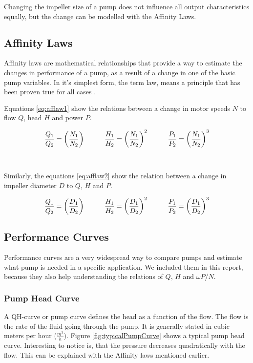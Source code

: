 Changing the impeller size of a pump does not influence all output characteristics equally,
but the change can be modelled with the Affinity Laws.

\subsection{Affinity Laws}\label{sub:afflaws}
Affinity laws are mathematical relationships that provide a way to estimate the 
changes in performance of a pump, as a result of a change in one of the basic pump variables.
In it's simplest form, the term law, means a principle that has been proven true for all cases \cite{Bachus2003}.

Equations \ref{eq:afflaw1} show the relations between a change in motor speeds $N$
to flow $Q$, head $H$ and power $P$.

\begin{equation}
	\frac{Q_1}{Q_2} = \left(\frac{N_1}{N_2}\right)
	\hspace{10mm}
	\frac{H_1}{H_2} = \left(\frac{N_1}{N_2}\right)^2
	\hspace{10mm}
	\frac{P_1}{P_2} = \left(\frac{N_1}{N_2}\right)^3
	\label{eq:afflaw1}	
\end{equation}
\cite{Volk2014}\\\\
Similarly, the equations \ref{eq:afflaw2} show the relation between a change in impeller diameter $D$
to  $Q$, $H$ and $P$.

\begin{equation}
	\frac{Q_1}{Q_2} = \left(\frac{D_1}{D_2}\right)
	\hspace{10mm}
	\frac{H_1}{H_2} = \left(\frac{D_1}{D_2}\right)^2
	\hspace{10mm}
	\frac{P_1}{P_2} = \left(\frac{D_1}{D_2}\right)^3
	\label{eq:afflaw2}	
\end{equation}
\cite{Volk2014}

\subsection{Performance Curves}
Performance curves are a very widespread way to compare pumps
and estimate what pump is needed in a specific application.
We included them in this report,
because they also help understanding the relations of $Q$, $H$ and $\omega P$/$N$.

\subsubsection{Pump Head Curve}
A QH-curve or pump curve defines the head as a function of the flow. 
The flow is the rate of the fluid going through the pump.
It is generally stated in cubic meters per hour ($\frac{m^{3}}{h}$).
Figure \ref{fig:typicalPumpCurve} shows a typical pump head curve.
Interesting to notice is,
that the pressure decreases quadratically with the flow.
This can be explained with the Affinity laws mentioned earlier.

